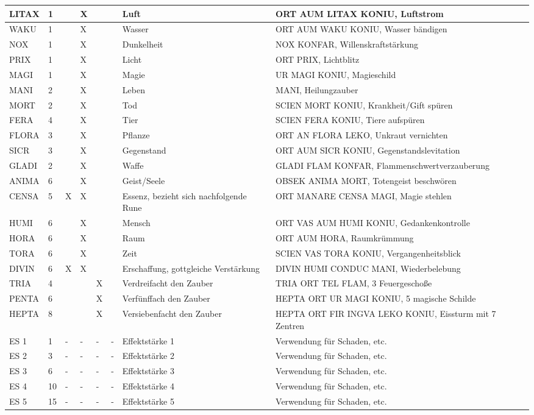 \documentclass{article}
\begin{document}
\begin{footnotesize}
\begin{tabular}{|m{1.7cm}|m{0.3cm}|m{1cm}|m{1cm}|m{1cm}|m{1cm}|m{3cm}|m{5cm}|}
\hline
LITAX&1&&X&&&Luft&ORT AUM LITAX KONIU, Luftstrom\\
\hline
WAKU&1&&X&&&Wasser&ORT AUM WAKU KONIU, Wasser bändigen\\
\hline
NOX&1&&X&&&Dunkelheit&NOX KONFAR, Willenskraftstärkung\\
\hline
PRIX&1&&X&&&Licht&ORT PRIX, Lichtblitz\\
\hline
MAGI&1&&X&&&Magie&UR MAGI KONIU, Magieschild\\
\hline
MANI&2&&X&&&Leben&MANI, Heilungzauber\\
\hline
MORT&2&&X&&&Tod&SCIEN MORT KONIU, Krankheit/Gift spüren\\
\hline
\hline
FERA&4&&X&&&Tier&SCIEN FERA KONIU, Tiere aufspüren\\
\hline
FLORA&3&&X&&&Pflanze&ORT AN FLORA LEKO, Unkraut vernichten\\
\hline
SICR&3&&X&&&Gegenstand&ORT AUM SICR KONIU, Gegenstandslevitation\\
\hline
GLADI&2&&X&&&Waffe&GLADI FLAM KONFAR, Flammenschwertverzauberung\\
\hline
\hline
ANIMA&6&&X&&&Geist/Seele&OBSEK ANIMA MORT, Totengeist beschwören\\
\hline
CENSA&5&X&X&&&Essenz, bezieht sich nachfolgende Rune&ORT MANARE CENSA MAGI, Magie stehlen\\
\hline
HUMI&6&&X&&&Mensch&ORT VAS AUM HUMI KONIU, Gedankenkontrolle\\
\hline
HORA&6&&X&&&Raum&ORT AUM HORA, Raumkrümmung\\
\hline
TORA&6&&X&&&Zeit&SCIEN VAS TORA KONIU, Vergangenheitsblick\\
\hline
DIVIN&6&X&X&&&Erschaffung, gottgleiche Verstärkung&DIVIN HUMI CONDUC MANI, Wiederbelebung\\
\hline
TRIA&4&&&X&&Verdreifacht den Zauber&TRIA ORT TEL FLAM, 3 Feuergeschoße\\
\hline
PENTA&6&&&X&&Verfünffach den Zauber&HEPTA ORT UR MAGI KONIU, 5 magische Schilde\\
\hline
HEPTA&8&&&X&&Versiebenfacht den Zauber&HEPTA ORT FIR INGVA LEKO KONIU, Eissturm mit 7 Zentren\\
\hline
\hline
ES 1&1&-&-&-&-&Effektstärke 1&Verwendung für Schaden, etc.\\
\hline
ES 2&3&-&-&-&-&Effektstärke 2&Verwendung für Schaden, etc.\\
\hline
ES 3&6&-&-&-&-&Effektstärke 3&Verwendung für Schaden, etc.\\
\hline
ES 4&10&-&-&-&-&Effektstärke 4&Verwendung für Schaden, etc.\\
\hline
ES 5&15&-&-&-&-&Effektstärke 5&Verwendung für Schaden, etc.\\
\hline
\end{tabular}
\end{footnotesize}
\end{document}
